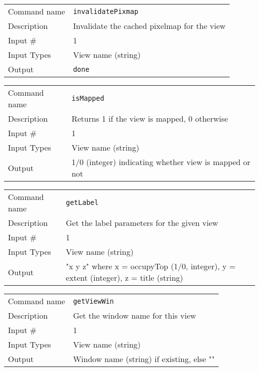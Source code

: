\bigskip

\noindent
\begin{tabular}{l|p{5in}}
\hline
Command name & {\tt invalidatePixmap} \\
Description  & Invalidate the cached pixelmap for the view \\
Input \#     & 1 \\
Input Types  & View name (string) \\
Output       & {\tt done} \\
\hline
\end{tabular}

\bigskip

\noindent
\begin{tabular}{l|p{5in}}
\hline
Command name & {\tt isMapped} \\
Description  & Returns 1 if the view is mapped, 0 otherwise \\
Input \#     & 1 \\
Input Types  & View name (string) \\
Output       & 1/0 (integer) indicating whether view is mapped or not \\
\hline
\end{tabular}

\bigskip

\noindent
\begin{tabular}{l|p{5in}}
\hline
Command name & {\tt getLabel} \\
Description  & Get the label parameters for the given view \\
Input \#     & 1 \\
Input Types  & View name (string) \\
Output       & "x y z" where x = occupyTop (1/0, integer),
               y = extent (integer), z = title (string) \\
\hline
\end{tabular}

\bigskip

\noindent
\begin{tabular}{l|p{5in}}
\hline
Command name & {\tt getViewWin} \\
Description  & Get the window name for this view \\
Input \#     & 1 \\
Input Types  & View name (string) \\
Output       & Window name (string) if existing, else "" \\
\hline
\end{tabular}

